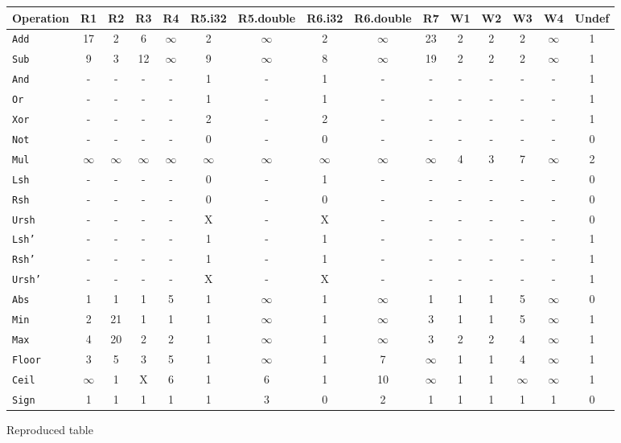 \documentclass{article}
\begin{document}
\newcommand\oo{$\infty$}
\begin{figure}[t]
\small
\centering
\begin{tabular}{lccccccccc|cccc|c} \toprule
Operation &    \textbf{R1} & \textbf{R2} & \textbf{R3} & \textbf{R4} & \textbf{R5.i32} & \textbf{R5.double} & \textbf{R6.i32} & \textbf{R6.double} & \textbf{R7} & \textbf{W1} & \textbf{W2} & \textbf{W3} & \textbf{W4} & \textbf{Undef} \\ 
\midrule
\texttt{Add} & 17 & 2 & 6 & \oo & 2 & \oo & 2 & \oo & 23 & 2 & 2 & 2 & \oo & 1 \\
\texttt{Sub} & 9 & 3 & 12 & \oo & 9 & \oo & 8 & \oo & 19 & 2 & 2 & 2 & \oo & 1 \\
\texttt{And} & -  & -  & -  & -  & 1 & -  & 1 & -  & -  & -  & -  & -  & -  & 1 \\
\texttt{Or} & -  & -  & -  & -  & 1 & -  & 1 & -  & -  & -  & -  & -  & -  & 1 \\
\texttt{Xor} & -  & -  & -  & -  & 2 & -  & 2 & -  & -  & -  & -  & -  & -  & 1 \\
\texttt{Not} & -  & -  & -  & -  & 0 & -  & 0 & -  & -  & -  & -  & -  & -  & 0 \\
\texttt{Mul} & \oo & \oo & \oo & \oo & \oo & \oo & \oo & \oo & \oo & 4 & 3 & 7 & \oo & 2 \\
\texttt{Lsh} & -  & -  & -  & -  & 0 & -  & 1 & -  & -  & -  & -  & -  & -  & 0 \\
\texttt{Rsh} & -  & -  & -  & -  & 0 & -  & 0 & -  & -  & -  & -  & -  & -  & 0 \\
\texttt{Ursh} & -  & -  & -  & -  & X & -  & X & -  & -  & -  & -  & -  & -  & 0 \\
\texttt{Lsh'} & -  & -  & -  & -  & 1 & -  & 1 & -  & -  & -  & -  & -  & -  & 1 \\
\texttt{Rsh'} & -  & -  & -  & -  & 1 & -  & 1 & -  & -  & -  & -  & -  & -  & 1 \\
\texttt{Ursh'} & -  & -  & -  & -  & X & -  & X & -  & -  & -  & -  & -  & -  & 1 \\
\texttt{Abs} & 1 & 1 & 1 & 5 & 1 & \oo & 1 & \oo & 1 & 1 & 1 & 5 & \oo & 0 \\
\texttt{Min} & 2 & 21 & 1 & 1 & 1 & \oo & 1 & \oo & 3 & 1 & 1 & 5 & \oo & 1 \\
\texttt{Max} & 4 & 20 & 2 & 2 & 1 & \oo & 1 & \oo & 3 & 2 & 2 & 4 & \oo & 1 \\
\texttt{Floor} & 3 & 5 & 3 & 5 & 1 & \oo & 1 & 7 & \oo & 1 & 1 & 4 & \oo & 1 \\
\texttt{Ceil} & \oo & 1 & X & 6 & 1 & 6 & 1 & 10 & \oo & 1 & 1 & \oo & \oo & 1 \\
\texttt{Sign} & 1 & 1 & 1 & 1 & 1 & 3 & 0 & 2 & 1 & 1 & 1 & 1 & 1 & 0 \\
\end{tabular}
\vspace*{-3.5mm}
\caption{Reproduced table}
\end{figure}
\end{document}
